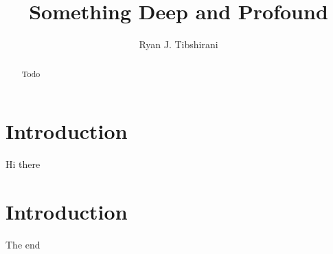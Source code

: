 \documentclass{article}
\title{Something Deep and Profound}
\author{Ryan J. Tibshirani}
\date{}
\begin{document}
\maketitle

\begin{abstract}
Todo 
\end{abstract}

\section{Introduction} 

Hi there 

\section{Introduction} 

The end


      
\end{document}
